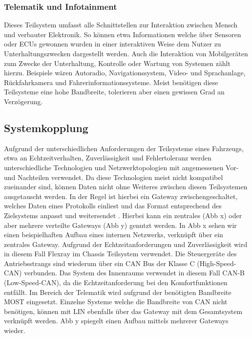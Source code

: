         \subsubsection{Telematik und Infotainment}
        Dieses Teilsystem umfasst alle Schnittstellen zur Interaktion zwischen Mensch und verbauter Elektronik. So können etwa Informationen welche über Sensoren
        oder ECUs gewonnen wurden in einer interaktiven Weise dem Nutzer zu Unterhaltungszwecken dargestellt werden. Auch die Interaktion von Mobilgeräten
        zum Zwecke der Unterhaltung, Kontrolle oder Wartung von Systemen zählt hierzu. Beispiele wären Autoradio, Navigationssystem, Video- und Sprachanlage, Rückfahrkamera und Fahrerinformationssysteme.
        Meist benötigen diese Teilsysteme eine hohe Bandbreite, tolerieren aber einen gewissen Grad an Verzögerung.
    \subsection{Systemkopplung}
    Aufgrund der unterschiedlichen Anforderungen der Teilsysteme eines Fahrzeugs, etwa an Echtzeitverhalten, Zuverlässigkeit und Fehlertoleranz werden unterschiedliche Technologien
    und Netzwerktopologien mit angemessenen Vor- und Nachteilen verwendet. Da diese Technologien meist nicht kompatibel zueinander sind, können Daten nicht ohne Weiteres zwischen diesen
    Teilsystemen ausgetauscht werden. In der Regel ist hierbei ein Gateway zwischengeschaltet, welches Daten eines Protokolls einliest und das Format entsprechend des Zielsystems anpasst
    und weitersendet \cite{reif2011bosch}\cite{TW_kim2014gateway}. Hierbei kann ein zentrales (Abb x) oder aber mehrere verteilte Gateways (Abb y) genutzt werden. 
    In Abb x sehen wir einen beispielhaften Aufbau eines internen Netzwerks, verknüpft über ein zentrales Gateway. Aufgrund der Echtzeitanforderungen und Zuverlässigkeit wird in diesem Fall Flexray
    im Chassis Teilsystem verwendet. Die Steuergeräte des Antriebsstrangs sind wiederum über ein CAN Bus der Klasse C (High-Speed-CAN) verbunden. Das System des Innenraums verwendet in diesem Fall 
    CAN-B (Low-Speed-CAN), da die Echtzeitanforderung bei den Komfortfunktionen entfällt. Im Bereich der Telematik wird aufgrund der benötigten Bandbreite MOST eingesetzt. Einzelne Systeme welche die
    Bandbreite von CAN nicht benötigen, können mit LIN ebenfalls über das Gateway mit dem Gesamtsystem verknüpft werden.
    Abb y spiegelt einen Aufbau mittels mehrerer Gateways wieder.
